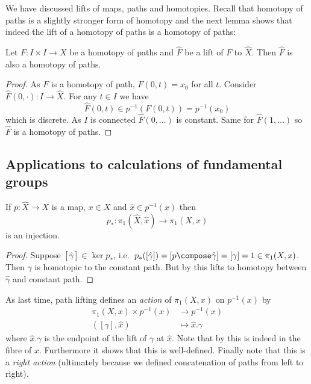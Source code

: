 \documentclass[a4paper]{article}
\begin{document}
We have discussed lifts of maps, paths and homotopies. Recall that homotopy of paths is a slightly stronger form of homotopy and the next lemma shows that indeed the lift of a homotopy of paths is a homotopy of paths:

\begin{lemma}
  \label{lem:lift of homotopy of paths}
  Let \(F: I \times I \to X\) be a homotopy of paths and \(\hat F\) be a lift of \(F\) to \(\hat X\). Then \(\hat F\) is also a homotopy of paths.
\end{lemma}

\begin{proof}
  As \(F\) is a homotopy of path, \(F(0, t) = x_0\) for all \(t\). Consider \(\hat F(0, \cdot): I \to \hat X\). For any \(t \in I\) we have
  \[
    \hat F(0, t) \in p^{-1}(F(0, t)) = p^{-1}(x_0)
  \]
  which is discrete. As \(I\) is connected \(\hat F(0, \dots)\) is constant. Same for \(\hat F(1, \dots)\) so \(\hat F\) is a homotopy of paths.
\end{proof}

\subsection{Applications to calculations of fundamental groups}

\begin{lemma}
  If \(p: \hat X \to X\) is a map, \(x \in X\) and \(\hat x \in p^{-1}(x)\) then
  \[
    p_*: \pi_1(\hat X, \hat x) \to \pi_1(X, x)
  \]
  is an injection.
\end{lemma}

\begin{proof}
  Suppose \([\hat \gamma] \in \ker p_*\), i.e.\ \(p_*([\hat \gamma]) = [p\compose \hat \gamma] = [\gamma] = 1 \in \pi_1(X, x)\). Then \(\gamma\) is homotopic to the constant path. But by  this lifts to homotopy between \(\hat \gamma\) and constant path.
\end{proof}

As last time, path lifting defines an \emph{action} of \(\pi_1(X, x)\) on \(p^{-1}(x)\) by
\begin{align*}
  \pi_1(X, x) \times p^{-1}(x) &\to p^{-1}(x) \\
  ([\gamma], \hat x) &\mapsto \hat x . \gamma
\end{align*}
where \(\hat x . \gamma\) is the endpoint of the lift of \(\gamma\) at \(\hat x\). Note that by  this is indeed in the fibre of \(x\). Furthermore it shows that this is well-defined. Finally note that this is a \emph{right action} (ultimately because we defined concatenation of paths from left to right).
\end{document}
